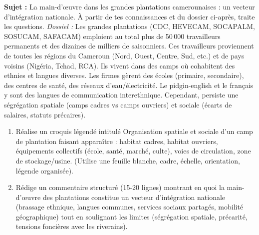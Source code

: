 \documentclass[11pt]{article}
\begin{document}
\begin{exercice}
\textbf{Sujet :} \og La main-d'œuvre dans les grandes plantations camerounaises : un vecteur d'intégration nationale. \fg
À partir de tes connaissances et du dossier ci-après, traite les questions.
\textit{Dossiel :} Les grandes plantations (CDC, HEVECAM, SOCAPALM, SOSUCAM, SAFACAM) emploient au total plus de 50\,000 travailleurs permanents et des dizaines de milliers de saisonniers. Ces travailleurs proviennent de toutes les régions du Cameroun (Nord, Ouest, Centre, Sud, etc.) et de pays voisins (Nigéria, Tchad, RCA). Ils vivent dans des camps où cohabitent des ethnies et langues diverses. Les firmes gèrent des écoles (primaire, secondaire), des centres de santé, des réseaux d'eau/électricité. Le pidgin-english et le français y sont des langues de communication interethnique. Cependant, persiste une ségrégation spatiale (camps cadres vs camps ouvriers) et sociale (écarts de salaires, statuts précaires).
\begin{enumerate}
\item Réalise un croquis légendé intitulé \og Organisation spatiale et sociale d'un camp de plantation \fg faisant apparaître : habitat cadres, habitat ouvriers, équipements collectifs (école, santé, marché, culte), voies de circulation, zone de stockage/usine. (Utilise une feuille blanche, cadre, échelle, orientation, légende organisée).
\item Rédige un commentaire structuré (15-20 lignes) montrant en quoi la main-d'œuvre des plantations constitue un vecteur d'intégration nationale (brassage ethnique, langues communes, services sociaux partagés, mobilité géographique) tout en soulignant les limites (ségrégation spatiale, précarité, tensions foncières avec les riverains).
\end{enumerate}
\end{exercice}
\end{document}
